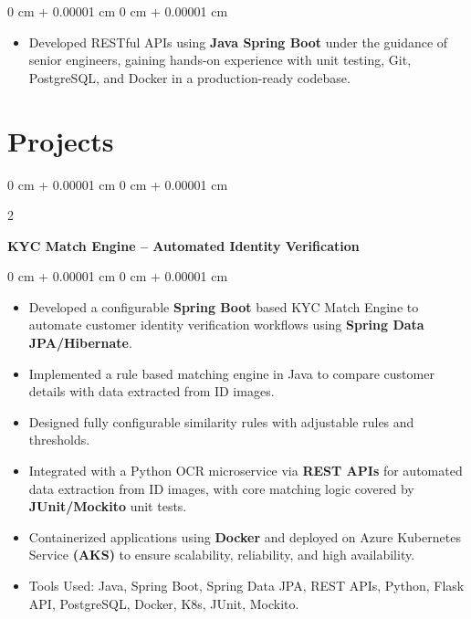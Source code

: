 \documentclass[10pt, letterpaper]{article}
\newenvironment{highlights}{
    \begin{itemize}[
        topsep=0.10 cm,
        parsep=0.10 cm,
        partopsep=0pt,
        itemsep=0pt,
        leftmargin=0 cm + 10pt
    ]
}{
    \end{itemize}
} %
\newenvironment{onecolentry}{
    \begin{adjustwidth}{
        0 cm + 0.00001 cm
    }{
        0 cm + 0.00001 cm
    }
}{
    \end{adjustwidth}
} %
\newenvironment{twocolentry}[2][]{
    \onecolentry
    \def\secondColumn{#2}
    \setcolumnwidth{\fill, 4.5 cm}
    \begin{paracol}{2}
}{
    \switchcolumn \raggedleft \secondColumn
    \end{paracol}
    \endonecolentry
} %
\begin{document}
            \begin{onecolentry}
            \begin{highlights}
            
            \item Developed RESTful APIs using \textbf{Java Spring Boot} under the guidance of senior engineers, gaining hands-on experience with unit testing, Git, PostgreSQL, and Docker in a production-ready codebase.
            
            \end{highlights}
            \end{onecolentry}
        
    
    \section{Projects}
        \begin{twocolentry}{
        }
            \textbf{\textbf{KYC Match Engine – Automated Identity Verification} }\end{twocolentry}

        \vspace{0.10 cm}
        \begin{onecolentry}
            \begin{highlights}
                \item Developed a configurable \textbf{Spring Boot} based KYC Match Engine to automate customer identity verification workflows using \textbf{Spring Data JPA/Hibernate}.
                \item Implemented a rule based matching engine in Java to compare customer details with data extracted from ID images.
                \item Designed fully configurable similarity rules with adjustable rules and thresholds.
                \item Integrated with a Python OCR microservice via \textbf{REST APIs} for automated data extraction from ID images, with core matching logic covered by \textbf{JUnit/Mockito} unit tests.
                \item Containerized applications using \textbf{Docker} and deployed on Azure Kubernetes Service \textbf{(AKS)} to ensure scalability, reliability, and high availability.
                \item Tools Used: Java, Spring Boot, Spring Data JPA, REST APIs, Python, Flask API, PostgreSQL, Docker, K8s, JUnit, Mockito.
            \end{highlights}
        \end{onecolentry}
\end{document}
